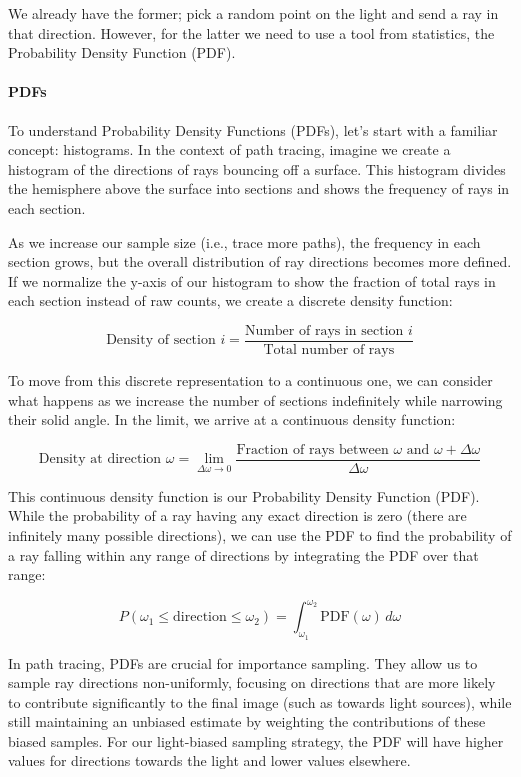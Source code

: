 \documentclass[12pt]{article}
\begin{document}
We already have the former; pick a random point on the light and send a ray in that direction. However, for the latter we need to use a tool from statistics, the Probability Density Function (PDF).

\paragraph{PDFs} To understand Probability Density Functions (PDFs), let's start with a familiar concept: histograms. In the context of path tracing, imagine we create a histogram of the directions of rays bouncing off a surface. This histogram divides the hemisphere above the surface into sections and shows the frequency of rays in each section.

As we increase our sample size (i.e., trace more paths), the frequency in each section grows, but the overall distribution of ray directions becomes more defined. If we normalize the y-axis of our histogram to show the fraction of total rays in each section instead of raw counts, we create a discrete density function:

$$
    \text{Density of section } i = \frac{\text{Number of rays in section } i}{\text{Total number of rays}}
$$

To move from this discrete representation to a continuous one, we can consider what happens as we increase the number of sections indefinitely while narrowing their solid angle. In the limit, we arrive at a continuous density function:

$$
    \text{Density at direction } \omega = \lim_{\Delta \omega \to 0} \frac{\text{Fraction of rays between } \omega \text{ and } \omega + \Delta \omega}{\Delta \omega}
$$

This continuous density function is our Probability Density Function (PDF). While the probability of a ray having any exact direction is zero (there are infinitely many possible directions), we can use the PDF to find the probability of a ray falling within any range of directions by integrating the PDF over that range:

$$
    P(\omega_1 \leq \text{direction} \leq \omega_2) = \int_{\omega_1}^{\omega_2} \text{PDF}(\omega) \, d\omega
$$

In path tracing, PDFs are crucial for importance sampling. They allow us to sample ray directions non-uniformly, focusing on directions that are more likely to contribute significantly to the final image (such as towards light sources), while still maintaining an unbiased estimate by weighting the contributions of these biased samples. For our light-biased sampling strategy, the PDF will have higher values for directions towards the light and lower values elsewhere.
\end{document}
